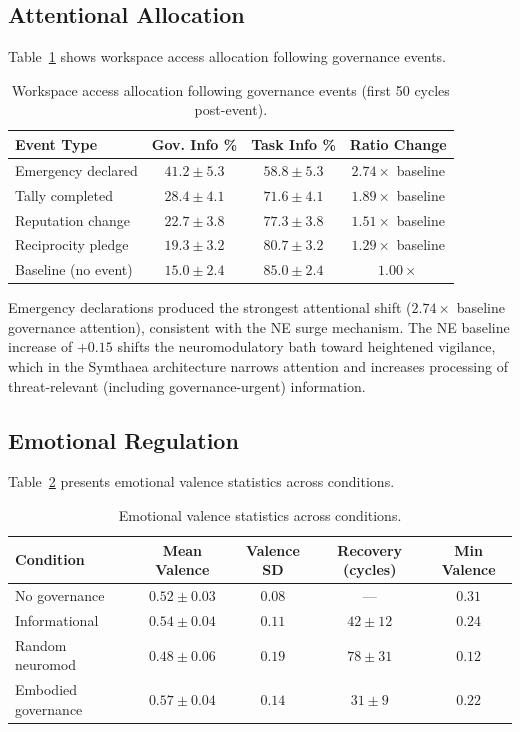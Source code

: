 \documentclass[11pt,a4paper]{article}
\begin{document}
\subsection{Attentional Allocation}

Table~\ref{tab:attention} shows workspace access allocation following governance events.

\begin{table}[h]
\centering
\caption{Workspace access allocation following governance events (first 50 cycles post-event).}
\label{tab:attention}
\begin{tabular}{lccc}
\toprule
\textbf{Event Type} & \textbf{Gov. Info \%} & \textbf{Task Info \%} & \textbf{Ratio Change} \\
\midrule
Emergency declared   & $41.2 \pm 5.3$ & $58.8 \pm 5.3$ & $2.74\times$ baseline \\
Tally completed      & $28.4 \pm 4.1$ & $71.6 \pm 4.1$ & $1.89\times$ baseline \\
Reputation change    & $22.7 \pm 3.8$ & $77.3 \pm 3.8$ & $1.51\times$ baseline \\
Reciprocity pledge   & $19.3 \pm 3.2$ & $80.7 \pm 3.2$ & $1.29\times$ baseline \\
Baseline (no event)  & $15.0 \pm 2.4$ & $85.0 \pm 2.4$ & $1.00\times$ \\
\bottomrule
\end{tabular}
\end{table}

Emergency declarations produced the strongest attentional shift ($2.74\times$ baseline governance attention), consistent with the NE surge mechanism.
The NE baseline increase of $+0.15$ shifts the neuromodulatory bath toward heightened vigilance, which in the Symthaea architecture narrows attention and increases processing of threat-relevant (including governance-urgent) information.

\subsection{Emotional Regulation}

Table~\ref{tab:emotion} presents emotional valence statistics across conditions.

\begin{table}[h]
\centering
\caption{Emotional valence statistics across conditions.}
\label{tab:emotion}
\begin{tabular}{lcccc}
\toprule
\textbf{Condition} & \textbf{Mean Valence} & \textbf{Valence SD} & \textbf{Recovery (cycles)} & \textbf{Min Valence} \\
\midrule
No governance       & $0.52 \pm 0.03$ & $0.08$ & --- & $0.31$ \\
Informational       & $0.54 \pm 0.04$ & $0.11$ & $42 \pm 12$ & $0.24$ \\
Random neuromod     & $0.48 \pm 0.06$ & $0.19$ & $78 \pm 31$ & $0.12$ \\
Embodied governance & $0.57 \pm 0.04$ & $0.14$ & $31 \pm 9$ & $0.22$ \\
\bottomrule
\end{tabular}
\end{table}
\end{document}
